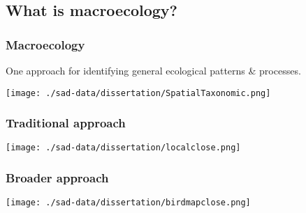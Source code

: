 \documentclass[14pt]{beamer}
\begin{document}
\subsection{What is macroecology?}
\begin{frame}[t]
\frametitle{Macroecology}
\normalsize One approach for identifying general ecological patterns \& processes.
\begin{center}
\texttt{[image: ./sad-data/dissertation/SpatialTaxonomic.png]}
\end{center}
\end{frame}


\begin{frame}[t]
\frametitle{Traditional approach}
\vspace{-7pt}
\begin{center}
\texttt{[image: ./sad-data/dissertation/localclose.png]}
\end{center}
\end{frame}


\begin{frame}[t]
\frametitle{Broader approach}
\vspace{-7pt}
\begin{center}
\texttt{[image: ./sad-data/dissertation/birdmapclose.png]}
\end{center}
\end{frame}

\end{document}
